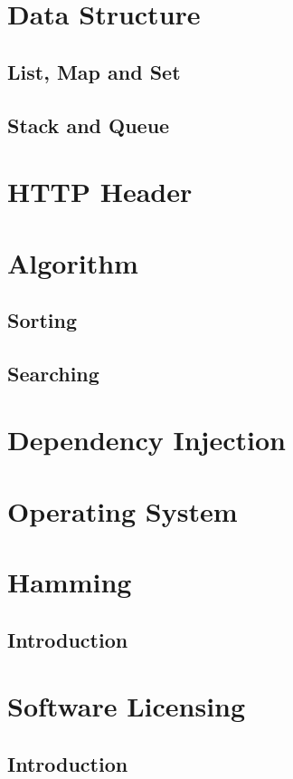 \documentclass[a4paper]{article}
\begin{document}
\section{Data Structure}
\subsection{List, Map and Set}
\subsection{Stack and Queue}

\section{HTTP Header}

\section{Algorithm}
\subsection{Sorting}
\subsection{Searching}

\section{Dependency Injection}

\section{Operating System}

\section{Hamming}
\subsection{Introduction}

\section{Software Licensing}
\subsection{Introduction}
\end{document}
